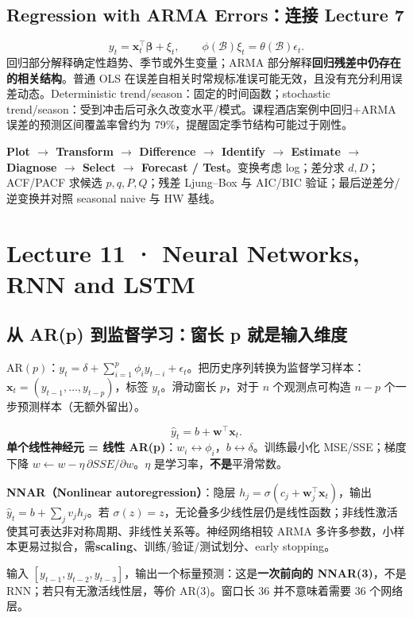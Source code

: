 \documentclass[UTF8,fontset=fandol,10.5pt,a4paper]{ctexart}
\newcommand{\eng}[1]{{\sffamily\color{navy}#1}}
\begin{document}
\subsection{Regression with ARMA Errors：连接 Lecture 7}
\[y_t=\mathbf x_t^\top\bm\beta+\xi_t,\qquad \phi(\mathcal B)\xi_t=\theta(\mathcal B)\epsilon_t.\]
回归部分解释确定性趋势、季节或外生变量；ARMA 部分解释\textbf{回归残差中仍存在的相关结构}。普通 OLS 在误差自相关时常规标准误可能无效，且没有充分利用误差动态。\eng{Deterministic trend/season}：固定的时间函数；\eng{stochastic trend/season}：受到冲击后可永久改变水平/模式。课程酒店案例中回归+ARMA 误差的预测区间覆盖率曾约为 79\%，提醒固定季节结构可能过于刚性。
\begin{keybox}[title={Box--Jenkins Workflow：通用题目答题模板}]
\textbf{Plot $\to$ Transform $\to$ Difference $\to$ Identify $\to$ Estimate $\to$ Diagnose $\to$ Select $\to$ Forecast / Test}。变换考虑 log；差分求 $d,D$；ACF/PACF 求候选 $p,q,P,Q$；残差 Ljung--Box 与 AIC/BIC 验证；最后逆差分/逆变换并对照 seasonal naive 与 HW 基线。
\end{keybox}
\clearpage
\section{Lecture 11 · Neural Networks, RNN and LSTM}
\subsection{从 AR(p) 到监督学习：窗长 p 就是输入维度}
AR$(p)$：$y_t=\delta+\sum_{i=1}^p\phi_i y_{t-i}+\epsilon_t$。把历史序列转换为监督学习样本：$\mathbf x_t=(y_{t-1},\ldots,y_{t-p})$，标签 $y_t$。滑动窗长 $p$，对于 $n$ 个观测点可构造 $n-p$ 个一步预测样本（无额外留出）。
\begin{keybox}
\[\hat y_t=b+\mathbf w^\top\mathbf x_t.\]
\textbf{单个线性神经元 = 线性 AR(p)}：$w_i\leftrightarrow\phi_i$，$b\leftrightarrow\delta$。训练最小化 MSE/SSE；梯度下降 $w\leftarrow w-\eta\,\partial SSE/\partial w$。$\eta$ 是学习率，\textbf{不是}平滑常数。
\end{keybox}
\textbf{NNAR（Nonlinear autoregression）}：隐层 $h_j=\sigma(c_j+\mathbf w_j^\top\mathbf x_t)$，输出 $\hat y_t=b+\sum_jv_jh_j$。若 $\sigma(z)=z$，无论叠多少线性层仍是线性函数；非线性激活使其可表达非对称周期、非线性关系等。神经网络相较 ARMA 多许多参数，小样本更易过拟合，需\textbf{scaling}、训练/验证/测试划分、\eng{early stopping}。
\begin{exam}
输入 $[y_{t-1},y_{t-2},y_{t-3}]$，输出一个标量预测：这是\textbf{一次前向的 NNAR(3)}，不是 RNN；若只有无激活线性层，等价 AR(3)。窗口长 36 并不意味着需要 36 个网络层。
\end{exam}
\end{document}
